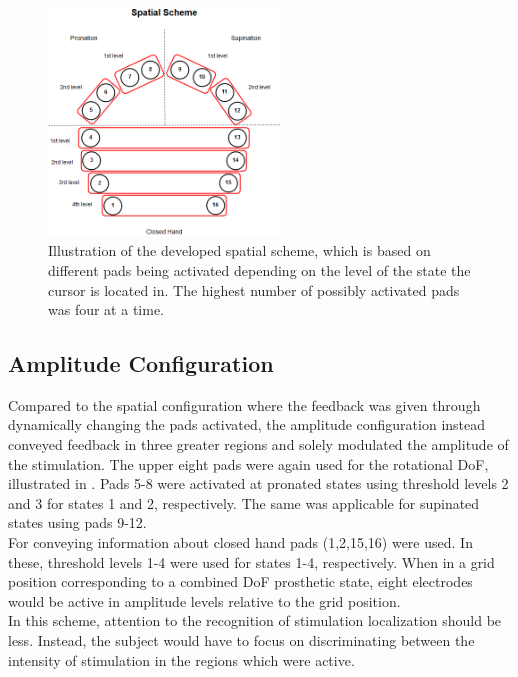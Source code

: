 \begin{figure}[H]                 
	\includegraphics[width=0.55\textwidth]{figures/El_array_spatial}  
	\caption{Illustration of the developed spatial scheme, which is based on different pads being activated depending on the level of the state the cursor is located in. The highest number of possibly activated pads was four at a time.}
	\label{fig:spatial} 
\end{figure}


\subsection{Amplitude Configuration}

Compared to the spatial configuration where the feedback was given through dynamically changing the pads activated, the amplitude configuration instead conveyed feedback in three greater regions and solely modulated the amplitude of the stimulation. The upper eight pads were again used for the rotational DoF, illustrated in . Pads 5-8 were activated at pronated states using threshold levels 2 and 3 for states 1 and 2, respectively. The same was applicable for supinated states using pads 9-12. \\
For conveying information about closed hand pads (1,2,15,16) were used. In these, threshold levels 1-4 were used for states 1-4, respectively. When in a grid position corresponding to a combined DoF prosthetic state, eight electrodes would be active in amplitude levels relative to the grid position. \\ In this scheme, attention to the recognition of stimulation localization should be less. Instead, the subject would have to focus on discriminating between the intensity of stimulation in the regions which were active.          

